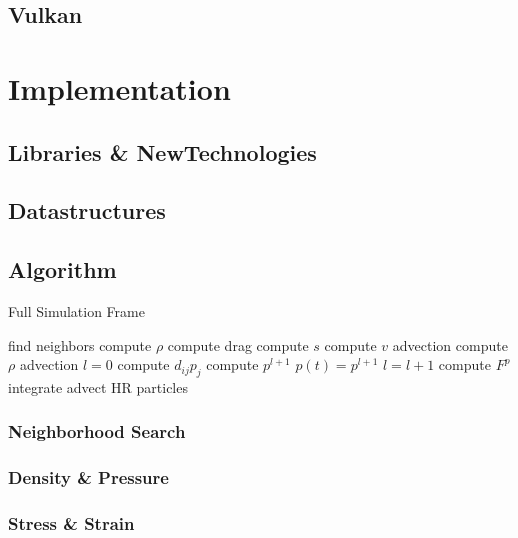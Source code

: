 \documentclass[intern]{cgMA}
\begin{document}
    \subsection{Vulkan}
    
    \section{Implementation}
    
    \subsection{Libraries \& NewTechnologies}
    
    \subsection{Datastructures}
    
    \subsection{Algorithm}
    \begin{algorithm}
        \caption{Full Simulation Frame}
        \begin{algorithmic}[1]
        \State find neighbors 
        \State compute $\rho$
        \State compute drag 
        \State compute $s$ 
        \State compute $v$ advection 
        \State compute $\rho$ advection 
        \State $l = 0$
            \State compute $d_{ij}p_{j}$
            \State compute $p^{l+1}$
            \State $p(t) = p^{l+1}$
            \State $l = l+1$
        \EndWhile
        \State compute $F^p$ 
        \State integrate 
        \State advect HR particles 
        \end{algorithmic}
    \end{algorithm}
    
    \subsubsection{Neighborhood Search}
    
    \subsubsection{Density \& Pressure}
    
    \subsubsection{Stress \& Strain}
    
\end{document}
